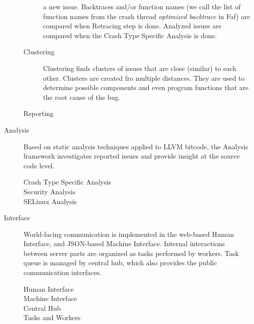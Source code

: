\documentclass{article}
\begin{document}
\begin{description}
\begin{description}
    a new issue.  Backtraces and/or function names (we call the list
    of function names from the crash thread \textit{optimized
      backtrace} in Faf) are compared when Retracing step is done.
    Analyzed issues are compared when the Crash Type Specific Analysis
    is done.
  \item[Clustering] Clustering finds clusters of issues that are close
    (similar) to each other. Clusters are created fro multiple
    distances. They are used to determine possible components and even
    program functions that are the root cause of the bug.
  \item[Reporting]
  \end{description}
\item[Analysis] Based on static analysis techniques applied to LLVM
  bitcode, the Analysis framework investigates reported issues and
  provide insight at the source code level.
  \begin{description}
  \item[Crash Type Specific Analysis]
  \item[Security Analysis]
  \item[SELinux Analysis]
  \end{description}
\item[Interface] World-facing communication is implemented in the
  web-based Human Interface, and JSON-based Machine Interface.
  Internal interactions between server parts are organized as tasks
  performed by workers. Task queue is managed by central hub, which
  also provides the public communication interfaces.
  \begin{description}
  \item[Human Interface]
  \item[Machine Interface]
  \item[Central Hub]
  \item[Tasks and Workers]
  \end{description}
\end{description}
\end{document}
